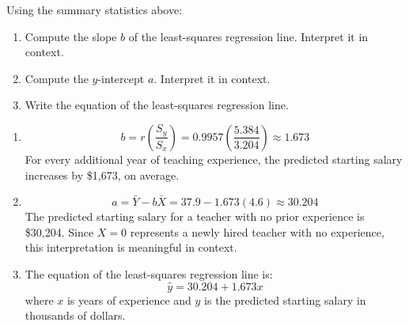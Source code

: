 \begin{Exercise}[title={Slope, Intercept, and the Regression Equation},
label={ex:lr_worked1}]
Using the summary statistics above:
\begin{enumerate}
    \item Compute the slope $b$ of the least-squares regression line. Interpret
    it in context.
    \item Compute the $y$-intercept $a$. Interpret it in context.
    \item Write the equation of the least-squares regression line.
\end{enumerate}
\end{Exercise}
\begin{Answer}[ref={ex:lr_worked1}]
\begin{enumerate}
    \item
    \[
    b = r\left(\frac{S_y}{S_x}\right) = 0.9957\left(\frac{5.384}{3.204}\right)
    \approx 1.673
    \]
    For every additional year of teaching experience, the predicted starting
    salary increases by \$1{,}673, on average.

    \item
    \[
    a = \bar{Y} - b\bar{X} = 37.9 - 1.673(4.6) \approx 30.204
    \]
    The predicted starting salary for a teacher with no prior experience is
    \$30{,}204. Since $X = 0$ represents a newly hired teacher with no experience,
    this interpretation is meaningful in context.

    \item The equation of the least-squares regression line is:
    \[
    \hat{y} = 30.204 + 1.673x
    \]
    where $x$ is years of experience and $\hat{y}$ is the predicted starting
    salary in thousands of dollars.
\end{enumerate}
\end{Answer}

